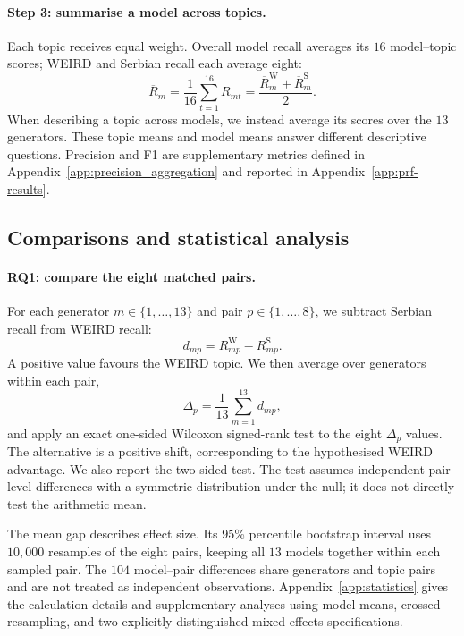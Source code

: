 \documentclass[11pt,a4paper]{article}
\begin{document}
\paragraph{Step 3: summarise a model across topics.}
Each topic receives equal weight. Overall model recall averages its $16$ model--topic scores; WEIRD and Serbian recall each average eight:
\begin{equation}
\overline R_m=\frac{1}{16}\sum_{t=1}^{16}R_{mt}
=\frac{\overline R_m^{\mathrm W}+\overline R_m^{\mathrm S}}{2}.
\label{eq:model-recall}
\end{equation}
When describing a topic across models, we instead average its scores over the $13$ generators. These topic means and model means answer different descriptive questions. Precision and F1 are supplementary metrics defined in Appendix~\ref{app:precision_aggregation} and reported in Appendix~\ref{app:prf-results}.

\subsection{Comparisons and statistical analysis}
\label{sec:statistics}
\paragraph{RQ1: compare the eight matched pairs.}
For each generator $m\in\{1,\ldots,13\}$ and pair $p\in\{1,\ldots,8\}$, we subtract Serbian recall from WEIRD recall:
\begin{equation}
d_{mp}=R_{mp}^{\mathrm W}-R_{mp}^{\mathrm S}.
\label{eq:pair-gap}
\end{equation}
A positive value favours the WEIRD topic. We then average over generators within each pair,
\begin{equation}
\Delta_p=\frac{1}{13}\sum_{m=1}^{13}d_{mp},
\label{eq:pair-mean}
\end{equation}
and apply an exact one-sided Wilcoxon signed-rank test to the eight $\Delta_p$ values. The alternative is a positive shift, corresponding to the hypothesised WEIRD advantage. We also report the two-sided test. The test assumes independent pair-level differences with a symmetric distribution under the null; it does not directly test the arithmetic mean.

The mean gap describes effect size. Its $95$\% percentile bootstrap interval uses $10{,}000$ resamples of the eight pairs, keeping all $13$ models together within each sampled pair. The $104$ model--pair differences share generators and topic pairs and are not treated as independent observations. Appendix~\ref{app:statistics} gives the calculation details and supplementary analyses using model means, crossed resampling, and two explicitly distinguished mixed-effects specifications.
\end{document}
